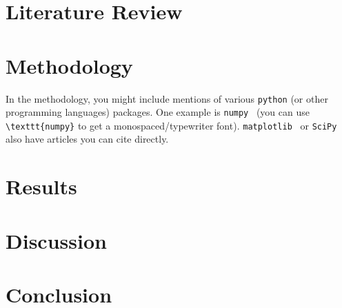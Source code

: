 \documentclass[a4paper,masters,en,listoffigures,listoftables]{NMBU}
\begin{document}
\clearpage
\section{Literature Review}

\clearpage
\section{Methodology}

In the methodology, you might include mentions of various \texttt{python} (or other programming languages) packages. One example is \texttt{numpy}~\cite{NumPy}  (you can use \verb|\texttt{numpy}| to get a monospaced/typewriter font). \texttt{matplotlib}~\cite{Matplotlib} or \texttt{SciPy}~\cite{SciPy} also have articles you can cite directly.

\clearpage
\section{Results}

\clearpage
\section{Discussion}

\clearpage
\section{Conclusion}

\clearpage
{} %

\clearpage
\appendices %
\end{document}
